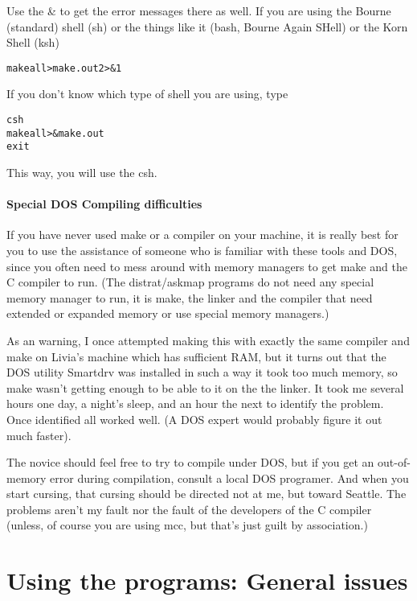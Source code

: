 \documentclass[%
	11pt,
        a4paper,
        twoside]{workrep}
\newcommand*{\prg}[1]{\textsf{#1}}		%
\newcommand{\dram}{\prg{distrat}/\prg{askmap}\xspace}	%
\begin{document}
Use the \& to get the error messages there as well.  If you are using
the Bourne (standard) shell (\prg{sh}) or the things like
it (\prg{bash}, Bourne Again SHell) or the Korn Shell (\prg{ksh})
\begin{alltt}
  make all >make.out  2>&1
\end{alltt}
If you don't know which type of shell you are using, type
\begin{alltt}
 csh
 make all >& make.out
 exit
\end{alltt}
This way, you will use the csh.

\subsubsection{Special DOS Compiling difficulties}\label{sec:dosprobs}

    If you have never used make or a compiler on your machine, it
    is really best for you to use the assistance of someone who
    is familiar with these tools and DOS, since you often need to
    mess around with memory managers to get make and the C compiler
    to run.  (The \dram programs do not need any special
    memory manager to run, it is make, the linker and the compiler
    that need extended or expanded memory or use special memory managers.)

    As an warning, I once attempted making this with exactly the same
    compiler and make on Livia's machine which has sufficient RAM, but
    it turns out that the DOS utility Smartdrv was installed in such a
    way it took too much memory, so make wasn't getting enough to be
    able to it on the the linker.  It took me several hours one day,
    a night's sleep, and an hour the next to identify the problem.  Once
    identified all worked well.  (A DOS expert would probably figure it
    out much faster).

    The novice should feel free to try to compile under DOS, but if
    you get an out-of-memory error during compilation, consult a
    local DOS programer.  And when you start cursing, that cursing
    should be directed not at me, but toward Seattle.  The problems
    aren't my fault nor the fault of the developers of the C compiler
    (unless, of course you are using mcc, but that's just guilt by
    association.)

\chapter[General usage]
  {Using the programs: General issues}\label{ch:general}
\end{document}

